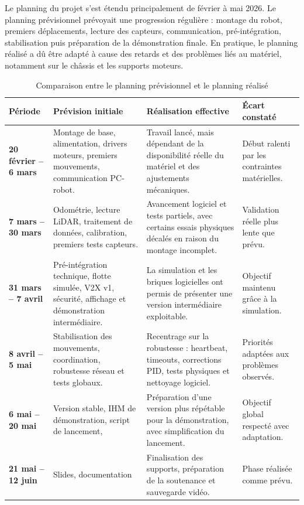 \documentclass[11pt,a4paper]{report}
\begin{document}
Le planning du projet s'est étendu principalement de février à mai 2026. Le planning prévisionnel prévoyait une progression régulière : montage du robot, premiers déplacements, lecture des capteurs, communication, pré-intégration, stabilisation puis préparation de la démonstration finale. En pratique, le planning réalisé a dû être adapté à cause des retards et des problèmes liés au matériel, notamment sur le châssis et les supports moteurs.

\begin{table}[H]
\centering
\small
\renewcommand{\arraystretch}{1.20}
\begin{tabular}{|p{3.2cm}|p{4.5cm}|p{4.5cm}|p{3.2cm}|}
\hline
\textbf{Période} & \textbf{Prévision initiale} & \textbf{Réalisation effective} & \textbf{Écart constaté} \\
\hline
\textbf{20 février -- 6 mars} &
Montage de base, alimentation, drivers moteurs, premiers mouvements, communication PC-robot. &
Travail lancé, mais dépendant de la disponibilité réelle du matériel et des ajustements mécaniques. &
Début ralenti par les contraintes matérielles. \\
\hline
\textbf{7 mars -- 30 mars} &
Odométrie, lecture LiDAR, traitement de données, calibration, premiers tests capteurs. &
Avancement logiciel et tests partiels, avec certains essais physiques décalés en raison du montage incomplet. &
Validation réelle plus lente que prévu. \\
\hline
\textbf{31 mars -- 7 avril} &
Pré-intégration technique, flotte simulée, V2X v1, sécurité, affichage et démonstration intermédiaire. &
La simulation et les briques logicielles ont permis de présenter une version intermédiaire exploitable. &
Objectif maintenu grâce à la simulation. \\
\hline
\textbf{8 avril -- 5 mai} &
Stabilisation des mouvements, coordination, robustesse réseau et tests globaux. &
Recentrage sur la robustesse : heartbeat, timeouts, corrections PID, tests physiques et nettoyage logiciel. &
Priorités adaptées aux problèmes observés. \\
\hline
\textbf{6 mai -- 20 mai} &
Version stable, IHM de démonstration, script de lancement,&
Préparation d'une version plus répétable pour la démonstration, avec simplification du lancement. &
Objectif global respecté avec adaptation. \\
\hline
\textbf{21 mai -- 12 juin} &
Slides, documentation
&
Finalisation des supports, préparation de la soutenance et sauvegarde vidéo. &
Phase réalisée comme prévu. \\
\hline
\end{tabular}
\caption{Comparaison entre le planning prévisionnel et le planning réalisé}
\label{tab:planning_previsionnel_reel}
\end{table}
\end{document}
